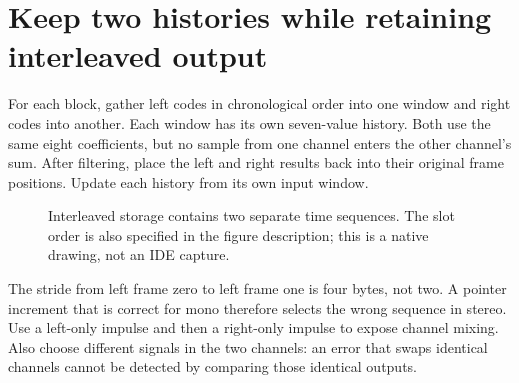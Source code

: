 \section{Keep two histories while retaining interleaved output}
For each block, gather left codes in chronological order into one window and right
codes into another. Each window has its own seven-value history. Both use the same
eight coefficients, but no sample from one channel enters the other channel's sum.
After filtering, place the left and right results back into their original frame
positions. Update each history from its own input window.

\begin{figure}[htbp]
  \centering
  \caption{Interleaved storage contains two separate time sequences. The slot order is also specified in the figure description; this is a native drawing, not an IDE capture.}
\end{figure}

The stride from left frame zero to left frame one is four bytes, not two. A pointer
increment that is correct for mono therefore selects the wrong sequence in stereo.
Use a left-only impulse and then a right-only impulse to expose channel mixing. Also
choose different signals in the two channels: an error that swaps identical channels
cannot be detected by comparing those identical outputs.
